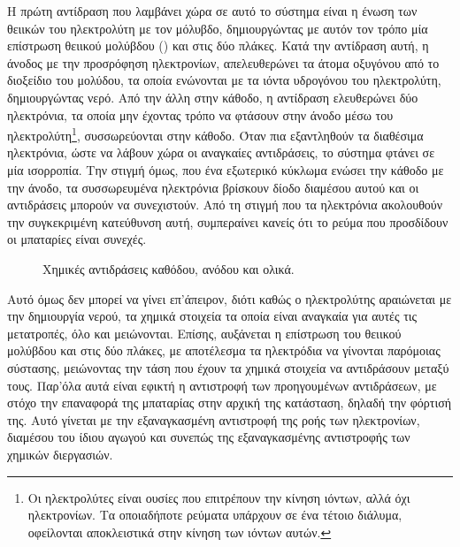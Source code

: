 \documentclass[12pt]{report}
\begin{document}
Η πρώτη αντίδραση που λαμβάνει χώρα σε αυτό το σύστημα είναι η ένωση των θειικών του ηλεκτρολύτη με τον μόλυβδο, δημιουργώντας με αυτόν τον τρόπο μία επίστρωση θειικού μολύβδου ({}) και στις δύο πλάκες. 
Κατά την αντίδραση αυτή, η άνοδος με την προσρόφηση ηλεκτρονίων, απελευθερώνει τα άτομα οξυγόνου από το διοξείδιο του μολύδου, τα οποία ενώνονται με τα ιόντα υδρογόνου του ηλεκτρολύτη, δημιουργώντας νερό. Από την άλλη στην κάθοδο,
η αντίδραση ελευθερώνει δύο ηλεκτρόνια, τα οποία μην έχοντας τρόπο να φτάσουν στην άνοδο μέσω του ηλεκτρολύτη\footnote{Οι ηλεκτρολύτες είναι ουσίες που επιτρέπουν την κίνηση ιόντων, αλλά όχι ηλεκτρονίων. Τα οποιαδήποτε ρεύματα
υπάρχουν σε ένα τέτοιο διάλυμα, οφείλονται αποκλειστικά στην κίνηση των ιόντων αυτών.}, συσσωρεύονται στην κάθοδο. Όταν πια εξαντληθούν τα διαθέσιμα ηλεκτρόνια, ώστε να λάβουν χώρα οι αναγκαίες αντιδράσεις, το σύστημα φτάνει σε
μία ισορροπία. Την στιγμή όμως, που ένα εξωτερικό κύκλωμα ενώσει την κάθοδο με την άνοδο, τα συσσωρευμένα ηλεκτρόνια βρίσκουν δίοδο διαμέσου αυτού και οι αντιδράσεις μπορούν να συνεχιστούν. Από τη στιγμή που τα ηλεκτρόνια ακολουθούν
την συγκεκριμένη κατεύθυνση αυτή, συμπεραίνει κανείς ότι το ρεύμα που προσδίδουν οι μπαταρίες είναι συνεχές.

\begin{figure}[h]
				\center
				{}
				\captionsetup{width=0.8\textwidth}
				\caption{Χημικές αντιδράσεις καθόδου, ανόδου και ολικά.}
				\label{eq:battery}
\end{figure}

Αυτό όμως δεν μπορεί να γίνει επ'άπειρον, διότι καθώς ο ηλεκτρολύτης αραιώνεται με την δημιουργία νερού, τα χημικά στοιχεία τα οποία είναι αναγκαία για αυτές τις μετατροπές, όλο και μειώνονται. 
Επίσης, αυξάνεται η επίστρωση του θειικού μολύβδου και στις δύο πλάκες, με αποτέλεσμα τα ηλεκτρόδια να γίνονται παρόμοιας σύστασης, μειώνοντας την τάση που έχουν τα χημικά στοιχεία να αντιδράσουν μεταξύ τους. 
Παρ'όλα αυτά είναι εφικτή η αντιστροφή των προηγουμένων αντιδράσεων, με στόχο την επαναφορά της μπαταρίας στην αρχική της κατάσταση, δηλαδή την φόρτισή της. 
Αυτό γίνεται με την εξαναγκασμένη αντιστροφή της ροής των ηλεκτρονίων, διαμέσου του ίδιου αγωγού και συνεπώς της εξαναγκασμένης αντιστροφής των χημικών διεργασιών. 
\end{document}
